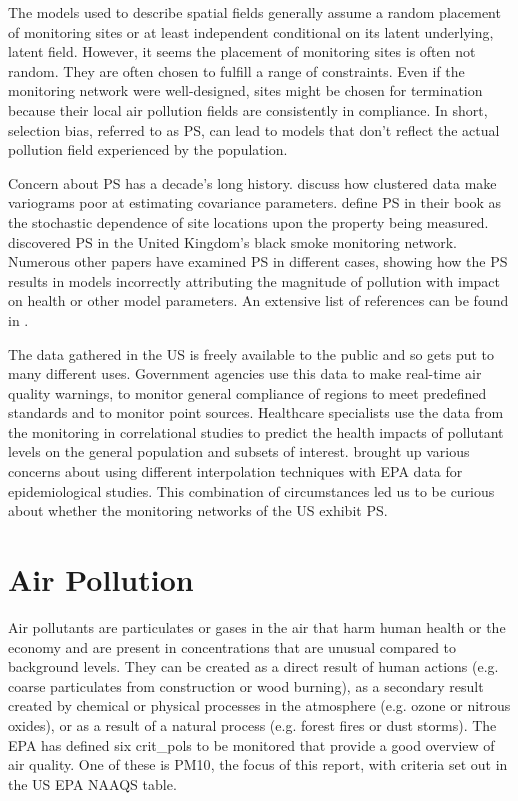 \documentclass{article}
\begin{document}
	The models used to describe spatial fields generally assume a random placement of monitoring sites or at least independent conditional on its latent underlying, latent field.  However, it seems the placement of monitoring sites is often not random. They are often chosen to fulfill a range of constraints. Even if the monitoring network were well-designed, sites might be chosen for termination because their local air pollution fields are consistently in compliance.  In short, selection bias, referred to as \ac{PS}, can lead to models that don't reflect the actual pollution field experienced by the population. 
	
	Concern about \ac{PS} has a decade's long history. \citet{isaaks1988spatial} discuss how clustered data make variograms poor at estimating covariance parameters. \cite{diggle:07} define \ac{PS} in their book as the stochastic dependence of site locations upon the property being measured. \cite{shaddick2012preferential} discovered  \ac{PS} in the United Kingdom's black smoke monitoring network. Numerous other papers have examined \ac{PS} in different cases, showing how the \ac{PS} results in models incorrectly attributing the magnitude of pollution with impact on health or other model parameters.  An extensive list of references can be found in \citep{Zidek:2012}.  
	
	The data gathered in the US is freely available to the public and so gets put to many different uses.  Government agencies use this data to make real-time air quality warnings, to monitor general compliance of regions to meet predefined standards and to monitor point sources.  Healthcare specialists use the data from the monitoring in correlational studies to predict the health impacts of pollutant levels on the general population and subsets of interest.  \cite{wong2004comparison} brought up various concerns about using different interpolation techniques with \ac{EPA} data for epidemiological studies.  This combination of circumstances led us to be curious about whether the monitoring networks of the US exhibit \ac{PS}.
	
	
	\section{Air Pollution}\label{sec:introdairpollution}
	Air pollutants are particulates or gases in the air that harm human health or the economy and are present in concentrations that are unusual compared to background levels.  They can be created as a direct result of human actions (e.g. coarse particulates from construction or wood burning), as a secondary result created by chemical or physical processes in the atmosphere (e.g. ozone or nitrous oxides), or as a result of a natural process (e.g. forest fires or dust storms).  The \ac{EPA} has defined six \glspl{crit_pol} to be monitored that provide a good overview of air quality.  One of these is \ac{PM10}, the focus of this report,  with criteria set out in the US EPA NAAQS table.
	
\end{document}
